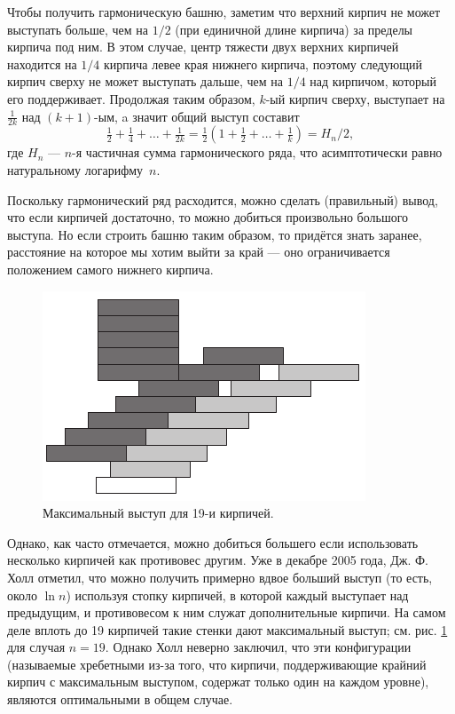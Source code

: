 Чтобы получить гармоническую башню, заметим что верхний кирпич не может выступать больше, чем на $1/2$ (при единичной длине кирпича) за пределы кирпича под ним.
В этом случае, центр тяжести двух верхних кирпичей находится на $1/4$ кирпича левее края нижнего кирпича, поэтому следующий кирпич сверху не может выступать дальше, чем на $1/4$ над кирпичом, который его поддерживает.
Продолжая таким образом, $k$-ый кирпич сверху, выступает на $\tfrac1{2k}$ над $(k + 1)$-ым, a значит общий выступ составит 
\[\tfrac12+\tfrac14+\dots+\tfrac1{2k}=\tfrac12(1+\tfrac12+\dots+\tfrac1k)=H_n/2,\]
где $H_n$ --- $n$-я частичная сумма гармонического ряда, что асимптотически равно натуральному логарифму~$n$.

Поскольку гармонический ряд расходится, можно сделать (правильный) вывод, что если кирпичей достаточно, то можно добиться произвольно большого выступа.
Но если строить башню таким образом, то придётся знать заранее, расстояние на которое мы хотим выйти за край --- оно ограничивается положением самого нижнего кирпича.

\begin{figure}[htb!]
\centering
\includegraphics[scale=1]{pics/kirpich2}
\caption{Максимальный выступ для 19-и кирпичей.}
\label{pic:kirpich2}
\end{figure}

Однако, как часто отмечается, можно добиться большего если использовать несколько кирпичей как противовес другим.
Уже в декабре 2005 года, Дж. Ф. Холл \cite{35} отметил, что можно получить примерно вдвое больший выступ (то есть, около $\ln n$) используя стопку кирпичей, в которой каждый выступает над предыдущим, и противовесом к ним служат дополнительные кирпичи. %
На самом деле вплоть до 19 кирпичей такие стенки дают максимальный выступ; см. рис. \ref{pic:kirpich2} для случая $n = 19$.
Однако Холл неверно заключил, что эти конфигурации (называемые хребетными из-за того, что кирпичи, поддерживающие крайний кирпич с максимальным выступом, содержат только один на каждом уровне), являются оптимальными в общем случае.

